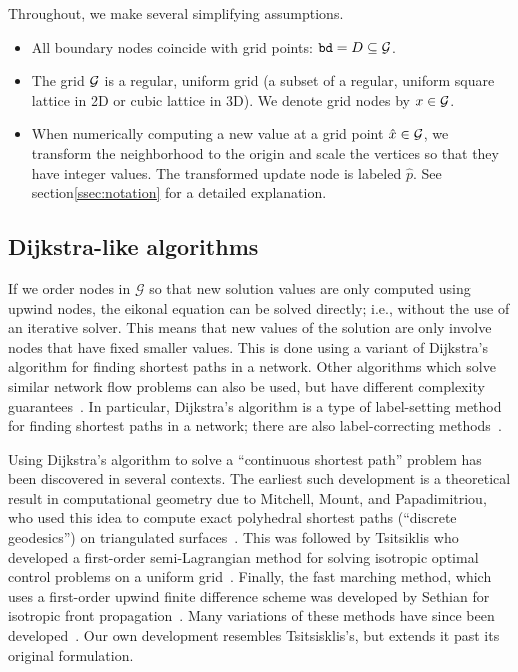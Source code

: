 \documentclass[smallcondensed]{svjour3}
\begin{document}
Throughout, we make several simplifying assumptions.
\begin{itemize}
\item All boundary nodes coincide with grid points:
  $\texttt{bd} = D \subseteq \mathcal{G}$.
\item The grid $\mathcal{G}$ is a regular, uniform grid (a subset of a
  regular, uniform square lattice in 2D or cubic lattice in 3D). We
  denote grid nodes by $x \in \mathcal{G}$.
\item When numerically computing a new value at a grid point
  $\hat{x} \in \mathcal{G}$, we transform the neighborhood to the origin and
  scale the vertices so that they have integer values. The transformed
  update node is labeled $\hat{p}$. See section\@ \ref{ssec:notation}
  for a detailed explanation.
\end{itemize}

\subsection{Dijkstra-like algorithms}\label{ssec:dijkstra-like}
If we order nodes in $\mathcal{G}$ so that new solution values are
only computed using upwind nodes, the eikonal equation can be solved
directly; i.e., without the use of an iterative solver. This means
that new values of the solution are only involve nodes that have fixed
smaller values. This is done using a variant of Dijkstra's algorithm
for finding shortest paths in a network. Other algorithms which solve
similar network flow problems can also be used, but have different
complexity guarantees~\cite{chacon2012fast}. In particular, Dijkstra's
algorithm is a type of label-setting method for finding shortest paths
in a network; there are also label-correcting
methods~\cite{bertsekas1998network}.

Using Dijkstra's algorithm to solve a ``continuous shortest path''
problem has been discovered in several contexts. The earliest such
development is a theoretical result in computational geometry due to
Mitchell, Mount, and Papadimitriou, who used this idea to compute
exact polyhedral shortest paths (``discrete geodesics'') on
triangulated surfaces~\cite{mitchell1987discrete}. This was followed
by Tsitsiklis who developed a first-order semi-Lagrangian method for
solving isotropic optimal control problems on a uniform
grid~\cite{tsitsiklis1995efficient}. Finally, the fast marching
method, which uses a first-order upwind finite difference scheme was
developed by Sethian for isotropic front
propagation~\cite{sethian1996fast}. Many variations of these methods
have since been
developed~\cite{sethian2003ordered,kao2008legendre}. Our own
development resembles Tsitsisklis's, but extends it past its original
formulation.
\end{document}
